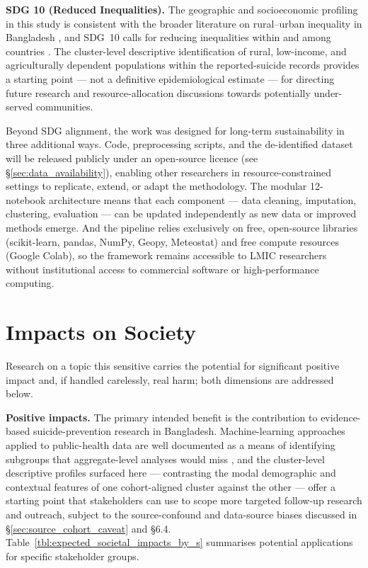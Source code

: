 \textbf{SDG 10 (Reduced Inequalities).} The geographic and socioeconomic profiling in this study is consistent with the broader literature on rural--urban inequality in Bangladesh \cite{ref50}, and SDG~10 calls for reducing inequalities within and among countries \cite{ref24}. The cluster-level descriptive identification of rural, low-income, and agriculturally dependent populations within the reported-suicide records provides a starting point --- not a definitive epidemiological estimate --- for directing future research and resource-allocation discussions towards potentially under-served communities.

Beyond SDG alignment, the work was designed for long-term sustainability in three additional ways. Code, preprocessing scripts, and the de-identified dataset will be released publicly under an open-source licence (see \S\ref{sec:data_availability}), enabling other researchers in resource-constrained settings to replicate, extend, or adapt the methodology. The modular 12-notebook architecture means that each component --- data cleaning, imputation, clustering, evaluation --- can be updated independently as new data or improved methods emerge. And the pipeline relies exclusively on free, open-source libraries (scikit-learn, pandas, NumPy, Geopy, Meteostat) and free compute resources (Google Colab), so the framework remains accessible to LMIC researchers without institutional access to commercial software or high-performance computing.

\section{Impacts on Society}

Research on a topic this sensitive carries the potential for significant positive impact and, if handled carelessly, real harm; both dimensions are addressed below.

\textbf{Positive impacts.} The primary intended benefit is the contribution to evidence-based suicide-prevention research in Bangladesh. Machine-learning approaches applied to public-health data are well documented as a means of identifying subgroups that aggregate-level analyses would miss \cite{ref43,ref44,ref53}, and the cluster-level descriptive profiles surfaced here --- contrasting the modal demographic and contextual features of one cohort-aligned cluster against the other --- offer a starting point that stakeholders can use to scope more targeted follow-up research and outreach, subject to the source-confound and data-source biases discussed in \S\ref{sec:source_cohort_caveat} and \S6.4. Table~\ref{tbl:expected_societal_impacts_by_s} summarises potential applications for specific stakeholder groups.


